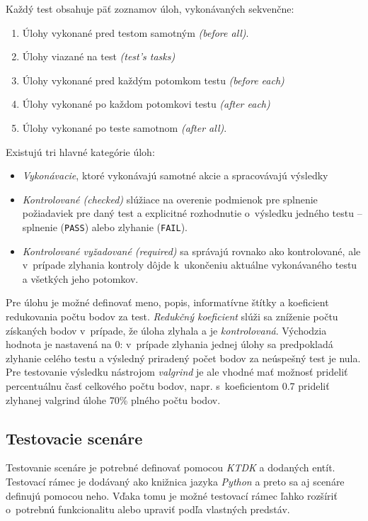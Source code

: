 \documentclass[
  digital, %
  oneside, %
  table,   %
  lof,     %
  lot,   %
]{fithesis3}
\begin{document}
Každý test obsahuje päť zoznamov úloh, vykonávaných sekvenčne:
\begin{enumerate}
    \item Úlohy vykonané pred testom samotným \emph{(before all)}.
    \item Úlohy viazané na test \emph{(test's tasks)}
    \item Úlohy vykonané pred každým potomkom testu \emph{(before each)} 
    \item Úlohy vykonané po každom potomkovi testu \emph{(after each)}
    \item Úlohy vykonané po teste samotnom \emph{(after all)}.
\end{enumerate}

Existujú tri hlavné kategórie úloh:
\begin{itemize}
    \item \emph{Vykonávacie}, ktoré vykonávajú samotné akcie a spracovávajú výsledky
    \item \emph{Kontrolované (checked)} slúžiace na overenie podmienok pre splnenie požiadaviek pre daný test a explicitné rozhodnutie o~výsledku jedného testu -- splnenie (\texttt{PASS}) alebo zlyhanie (\texttt{FAIL}).
    \item \emph{Kontrolované vyžadované (required)} sa správajú rovnako ako kontrolované, ale v~prípade zlyhania kontroly dôjde k~ukončeniu aktuálne vykonávaného testu a všetkých jeho potomkov.
\end{itemize}

Pre úlohu je možné definovať meno, popis, informatívne štítky a koeficient redukovania počtu bodov za test. \emph{Redukčný koeficient} slúži sa zníženie počtu získaných bodov v~prípade, že úloha zlyhala a je \emph{kontrolovaná}. Východzia hodnota je nastavená na 0: v~prípade zlyhania jednej úlohy sa predpokladá zlyhanie celého testu a výsledný priradený počet bodov za neúspešný test je nula. Pre testovanie výsledku nástrojom \emph{valgrind} je ale vhodné mať možnosť prideliť percentuálnu časť celkového počtu bodov, napr. s~koeficientom 0.7 prideliť zlyhanej valgrind úlohe 70\% plného počtu bodov.

\subsection{Testovacie scenáre}

Testovanie scenáre je potrebné definovať pomocou \emph{KTDK} a dodaných entít. Testovací rámec je dodávaný ako knižnica jazyka \emph{Python} a preto sa aj scenáre definujú pomocou neho. Vďaka tomu je možné testovací rámec ľahko rozšíriť o~potrebnú funkcionalitu alebo upraviť podľa vlastných predstáv. 
\end{document}
